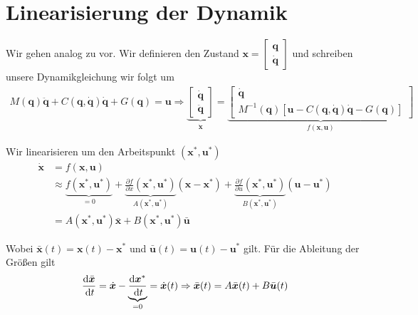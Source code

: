 \documentclass[a4paper, 12pt]{scrartcl}
\newcommand{\dt}{\thinspace \mathrm{d}t}
\begin{document}
\newpage


\section{Linearisierung der Dynamik}

Wir gehen analog zu \cite{ICIIECS2017} vor.
Wir definieren den Zustand 
$\textbf{x} = 
\begin{bmatrix}
    \textbf{q} \\ \dot{\textbf{q}}
\end{bmatrix}$
und schreiben unsere Dynamikgleichung wir folgt um 
\begin{align*}
    M(\textbf{q}) \ddot{\textbf{q}} 
    + C(\textbf{q}, \dot{\textbf{q}}) \dot{\textbf{q}} 
    + G(\textbf{q}) = \bm{u} 
    \Rightarrow
    \underbrace{
            \begin{bmatrix}
                \dot{\textbf{q}} \\ \ddot{\textbf{q}}
            \end{bmatrix}
    }_{
        \dot{\textbf{x}}
    }
    =
    \underbrace{
        \begin{bmatrix}
            \dot{\textbf{q}} \\
            M^{-1}(\textbf{q}) 
            \left[ 
                \bm{u} - C(\textbf{q}, \dot{\textbf{q}}) \dot{\textbf{q}} - G(\textbf{q}) 
                \right]
        \end{bmatrix}
    }_{
        f(\textbf{x}, \bm{u})
    }
\end{align*}

Wir linearisieren um den Arbeitspunkt $(\bm{x}^*, \bm{u}^*)$
\begin{align*}
    \dot{\bm{x}} 
    &= f(\bm{x},\bm{u}) \\
    &\approx \underbrace{f(\bm{x}^*,\bm{u}^*)}_{= 0} + 
    \underbrace{\frac{\partial f}{\partial x}(\bm{x}^*,\bm{u}^*)}_{A(\bm{x}^*,\bm{u}^*)}(\bm{x}-\bm{x}^*) 
    + \underbrace{\frac{\partial f}{\partial u}(\bm{x}^*,\bm{u}^*)}_{B(\bm{x}^*,\bm{u}^*)}(\bm{u}-\bm{u}^*) 
    \\
    &= A(\bm{x}^*,\bm{u}^*) \bar{\bm{x}} + B(\bm{x}^*,\bm{u}^*) \bar{\bm{u}}
\end{align*}

Wobei $\bar{\bm{x}}(t) = \bm{x}(t) -\bm{x}^*$ und $\bar{\bm{u}}(t) = \bm{u}(t)-\bm{u}^*$ gilt. 
Für die Ableitung der Größen gilt
\begin{align*}
    \frac{\mathrm{d} \bar{\bm{x}}}{\dt}
    = \dot{\bm{x}} - \underbrace{\frac{\mathrm{d} \bm{x}^*}{\dt}}_{= 0} 
    = \dot{\bm{x}}(t) 
    \Rightarrow 
    \bar{\bm{x}}(t) = A \bar{\bm{x}}(t) + B \bar{\bm{u}}(t)
\end{align*}
\end{document}
